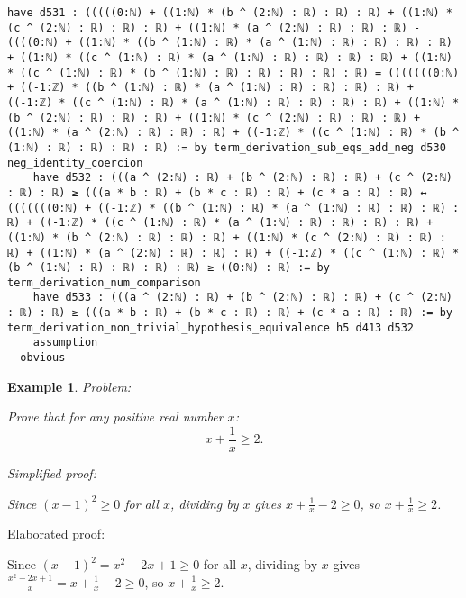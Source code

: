 \documentclass{article}
\newtheorem{example}{Example}
\begin{document}
\begin{tcolorbox}[colback=white!10, width=\linewidth]
\begin{lstlisting}[language=Lean4]
    have d531 : (((((0:ℕ) + ((1:ℕ) * (b ^ (2:ℕ) : ℝ) : ℝ) : ℝ) + ((1:ℕ) * (c ^ (2:ℕ) : ℝ) : ℝ) : ℝ) + ((1:ℕ) * (a ^ (2:ℕ) : ℝ) : ℝ) : ℝ) - ((((0:ℕ) + ((1:ℕ) * ((b ^ (1:ℕ) : ℝ) * (a ^ (1:ℕ) : ℝ) : ℝ) : ℝ) : ℝ) + ((1:ℕ) * ((c ^ (1:ℕ) : ℝ) * (a ^ (1:ℕ) : ℝ) : ℝ) : ℝ) : ℝ) + ((1:ℕ) * ((c ^ (1:ℕ) : ℝ) * (b ^ (1:ℕ) : ℝ) : ℝ) : ℝ) : ℝ) : ℝ) = (((((((0:ℕ) + ((-1:ℤ) * ((b ^ (1:ℕ) : ℝ) * (a ^ (1:ℕ) : ℝ) : ℝ) : ℝ) : ℝ) + ((-1:ℤ) * ((c ^ (1:ℕ) : ℝ) * (a ^ (1:ℕ) : ℝ) : ℝ) : ℝ) : ℝ) + ((1:ℕ) * (b ^ (2:ℕ) : ℝ) : ℝ) : ℝ) + ((1:ℕ) * (c ^ (2:ℕ) : ℝ) : ℝ) : ℝ) + ((1:ℕ) * (a ^ (2:ℕ) : ℝ) : ℝ) : ℝ) + ((-1:ℤ) * ((c ^ (1:ℕ) : ℝ) * (b ^ (1:ℕ) : ℝ) : ℝ) : ℝ) : ℝ) := by term_derivation_sub_eqs_add_neg d530 neg_identity_coercion
    have d532 : (((a ^ (2:ℕ) : ℝ) + (b ^ (2:ℕ) : ℝ) : ℝ) + (c ^ (2:ℕ) : ℝ) : ℝ) ≥ (((a * b : ℝ) + (b * c : ℝ) : ℝ) + (c * a : ℝ) : ℝ) ↔ (((((((0:ℕ) + ((-1:ℤ) * ((b ^ (1:ℕ) : ℝ) * (a ^ (1:ℕ) : ℝ) : ℝ) : ℝ) : ℝ) + ((-1:ℤ) * ((c ^ (1:ℕ) : ℝ) * (a ^ (1:ℕ) : ℝ) : ℝ) : ℝ) : ℝ) + ((1:ℕ) * (b ^ (2:ℕ) : ℝ) : ℝ) : ℝ) + ((1:ℕ) * (c ^ (2:ℕ) : ℝ) : ℝ) : ℝ) + ((1:ℕ) * (a ^ (2:ℕ) : ℝ) : ℝ) : ℝ) + ((-1:ℤ) * ((c ^ (1:ℕ) : ℝ) * (b ^ (1:ℕ) : ℝ) : ℝ) : ℝ) : ℝ) ≥ ((0:ℕ) : ℝ) := by term_derivation_num_comparison
    have d533 : (((a ^ (2:ℕ) : ℝ) + (b ^ (2:ℕ) : ℝ) : ℝ) + (c ^ (2:ℕ) : ℝ) : ℝ) ≥ (((a * b : ℝ) + (b * c : ℝ) : ℝ) + (c * a : ℝ) : ℝ) := by term_derivation_non_trivial_hypothesis_equivalence h5 d413 d532
    assumption
  obvious

\end{lstlisting}
\end{tcolorbox}


\begin{example}
Problem:
\begin{tcolorbox}[colback=yellow!10, width=\linewidth]
Prove that for any positive real number $x$:
    $$x + \frac{1}{x} \geq 2.$$
\end{tcolorbox}

Simplified proof:
\begin{tcolorbox}[colback=blue!10, width=\linewidth]
Since $(x-1)^2 \ge 0$ for all $x$, dividing by $x$ gives $x + \frac{1}{x} - 2 \ge 0$, so $x + \frac{1}{x} \ge 2$.
\end{tcolorbox}
\end{example}

Elaborated proof:
\begin{tcolorbox}[colback=green!10, width=\linewidth]
Since $(x-1)^2 = x^2 - 2x + 1 \ge 0$ for all $x$, dividing by $x$ gives $\frac{x^2 - 2x + 1}{x} = x + \frac{1}{x} - 2 \ge 0$, so $x + \frac{1}{x} \ge 2$.
\end{tcolorbox}
\end{document}
